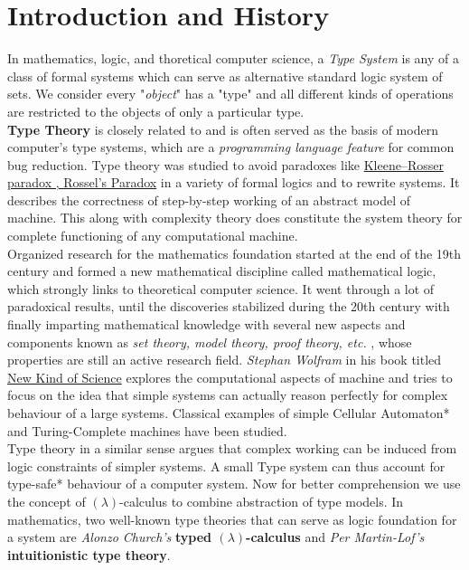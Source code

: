 \chapter{Introduction and History }

In mathematics, logic, and thoretical computer science, a \textit{Type System} is any of a class of formal systems which can serve as alternative standard logic system of sets. We consider every "\textit{object}" has a "type" and all different kinds of operations are restricted to the objects of only a particular type.\\

\textbf{Type Theory} is closely related to and is often served as the basis of modern computer's type systems, which are a \textit{programming language feature} for common bug reduction. Type theory was studied to avoid paradoxes like \underline{Kleene–Rosser paradox , Rossel's Paradox} in a variety of formal logics and to rewrite systems. It describes the correctness of step-by-step working of an abstract model of machine. This along with complexity theory does constitute the system theory for complete functioning of any computational machine.\\

Organized research for the mathematics foundation started at the end of the 19th century and formed a new mathematical discipline called mathematical logic, which strongly links to theoretical computer science. It went through a lot of paradoxical results, until the discoveries stabilized during the 20th century with finally imparting mathematical knowledge with several new aspects and components known as  \textit{set theory, model theory, proof theory, etc.} , whose properties are still an active research field. \textit{Stephan Wolfram} in his book titled \underline{New Kind of Science} explores the computational aspects of machine and tries to focus on the idea that simple systems can actually reason perfectly for complex behaviour of a large systems. Classical examples of simple Cellular Automaton* and Turing-Complete machines have been studied.\\

Type theory in a similar sense argues that complex working can be induced from logic constraints of simpler systems. A small Type system can thus account for type-safe* behaviour of a computer system. Now for better comprehension we use the concept of $(\lambda)$-calculus to combine abstraction of type models. In mathematics, two well-known type theories that can serve as logic foundation for a system are \textit{Alonzo Church's} \textbf{ typed $(\lambda)$-calculus} and \textit{Per Martin-Lof's } \textbf{intuitionistic type theory}. 


